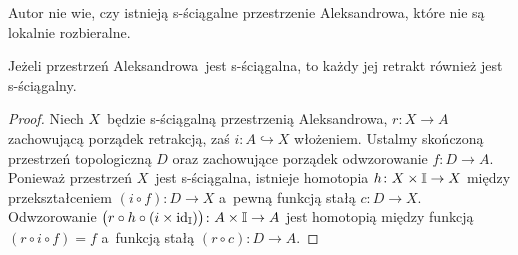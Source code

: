 Autor nie wie, czy istnieją s-ściągalne przestrzenie Aleksandrowa, które nie są lokalnie rozbieralne.

\begin{lem}\label{lem-retrakcje_zachowuja_s-sciagalnosc}
Jeżeli przestrzeń Aleksandrowa~jest s-ściągalna, to każdy jej retrakt również jest s-ściągalny.
\end{lem}
\begin{proof}
Niech $X$~będzie s-ściągalną przestrzenią Aleksandrowa, $r\colon X\to A$ zachowującą porządek retrakcją, zaś $i\colon A\hookrightarrow X$ włożeniem. Ustalmy skończoną przestrzeń topologiczną $D$ oraz zachowujące porządek odwzorowanie \mbox{$f\colon D\to A$}. Ponieważ przestrzeń $X$~jest s-ściągalna, istnieje homotopia \mbox{$h\colon X\times \mathbb{I}\to X$} między przekształceniem $(i\circ f)\colon D\to X$ a~pewną funkcją stałą $c\colon D\to X$. Odwzorowanie $\bigl(r\circ h \circ (i\times {\operatorname{id}_{\mathbb{I}}})\bigr)\colon A\times\mathbb{I} \to A$ jest homotopią między funkcją $(r\circ i\circ f)=f$ a~funkcją stałą $(r\circ c)\colon D\to A$.
\end{proof}

